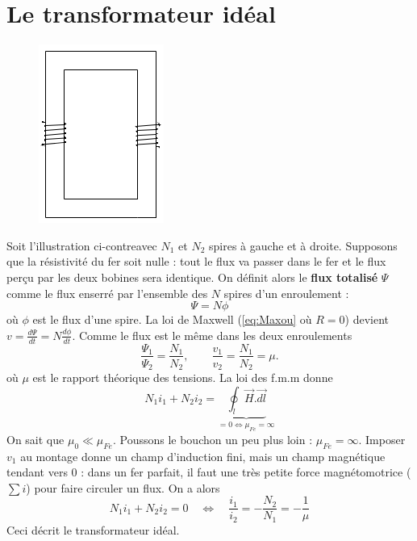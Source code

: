 \section{Le transformateur idéal}
		\begin{figure}
		\vspace{-5mm}
		\includegraphics[scale=0.4]{ch3/image1.png}
		\end{figure}
Soit l'illustration ci-contreavec $N_1$ et $N_2$ spires à gauche 
et à droite. Supposons que la résistivité du fer soit nulle : tout 
le flux va passer dans le fer et le flux perçu par les deux bobines 
sera identique. On définit alors le \textbf{flux totalisé} $\Psi$ 
comme le flux enserré par l'ensemble des $N$ spires d'un enroulement :
\begin{equation}
\Psi = N\phi
\end{equation}
où $\phi$ est le flux d'une spire. La loi de Maxwell (\autoref{eq:Maxou} 
où $R=0$) devient $v = \frac{d\Psi}{dt} = N\frac{d\phi}{dt}$. Comme le flux 
est le même dans les deux enroulements
\begin{equation}
\frac{\Psi_1}{\Psi_2} = \dfrac{N_1}{N_2},\qquad \frac{v_1}{v_2} = 
\frac{N_1}{N_2} = \mu.
\end{equation}
où $\mu$ est le rapport théorique des tensions. La loi des f.m.m 
donne
\begin{equation}
N_1i_1 + N_2i_2 = \underbrace{\oint_l \vec{H}.\vec{dl}}_{=0
\Leftrightarrow \mu_{Fe}=\infty}
\end{equation}
On sait que $\mu_0 \ll \mu_{Fe}$. Poussons le bouchon un peu plus 
loin : $\mu_{Fe} = \infty$. Imposer $v_1$ au montage donne un champ 
d'induction fini, mais un champ magnétique tendant vers 0 : dans un 
fer parfait, il faut une très petite force magnétomotrice ($\sum i$) 
pour faire circuler un flux. On a alors
\begin{equation}
N_1i_1 + N_2i_2 =0\quad\Leftrightarrow\quad \frac{i_1}{i_2} = -
\frac{N_2}{N_1} = -\frac{1}{\mu}
\end{equation}
Ceci décrit le transformateur idéal.

